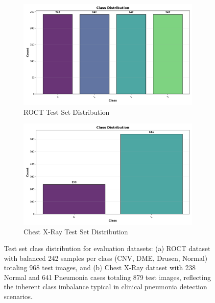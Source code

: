 \documentclass[preprint,12pt]{elsarticle}
\begin{document}
\begin{figure}[!t]
\centering
\begin{subfigure}[b]{0.45\columnwidth}
\centering
\includegraphics[width=\columnwidth]{fig/class_distribution_roct.png}
\caption{ROCT Test Set Distribution}
\end{subfigure}
\hfill
\begin{subfigure}[b]{0.45\columnwidth}
\centering
\includegraphics[width=\columnwidth]{fig/class_distribution_chest_xray.png}
\caption{Chest X-Ray Test Set Distribution}
\end{subfigure}
\caption{Test set class distribution for evaluation datasets: (a) ROCT dataset with balanced 242 samples per class (CNV, DME, Drusen, Normal) totaling 968 test images, and (b) Chest X-Ray dataset with 238 Normal and 641 Pneumonia cases totaling 879 test images, reflecting the inherent class imbalance typical in clinical pneumonia detection scenarios.}
\label{fig:class_distribution}
\end{figure}
\end{document}
